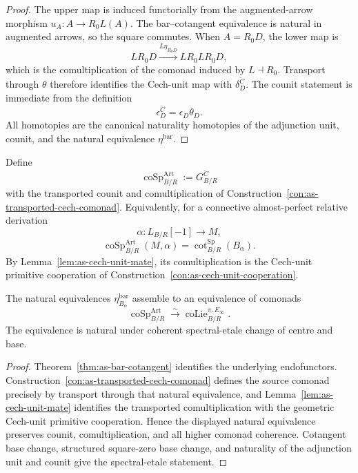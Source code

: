 \begin{proof}
The upper map is induced functorially from the augmented-arrow morphism
$u_A:A\to R_0L(A)$.  The bar--cotangent equivalence is natural in augmented
arrows, so the square commutes.  When $A=R_0D$, the lower map is
\[
    LR_0D
    \xrightarrow{L\eta_{R_0D}}
    LR_0LR_0D,
\]
which is the comultiplication of the comonad induced by $L\dashv R_0$.
Transport through $\theta$ therefore identifies the Cech-unit map with
$\delta_D^{\check C}$.  The counit statement is immediate from the definition
\[
    \epsilon_D^{\check C}=\epsilon_D\theta_D.
\]
All homotopies are the canonical naturality homotopies of the adjunction unit,
counit, and the natural equivalence $\eta^{\mathrm{bar}}$.
\end{proof}

\begin{definition}
\label{def:as-spencer-colie}
Define
\[
\boxed{
    \operatorname{coSp}^{\mathrm{Art}}_{B/R}
    :=
    G^{\check C}_{B/R}
}
\]
with the transported counit and comultiplication of
Construction~\ref{con:as-transported-cech-comonad}.  Equivalently, for a
connective almost-perfect relative derivation
\[
    \alpha:L_{B/R}[-1]\longrightarrow M,
\]
\[
    \operatorname{coSp}^{\mathrm{Art}}_{B/R}(M,\alpha)
    =
    \operatorname{cot}^{\mathrm{Sp}}_{B/R}(B_\alpha).
\]
By Lemma~\ref{lem:as-cech-unit-mate}, its comultiplication is the
Cech-unit primitive cooperation of
Construction~\ref{con:as-cech-unit-cooperation}.
\end{definition}

\begin{theorem}
\label{thm:as-spencer-colie-equals-colie}
The natural equivalences
$\eta_{B_\alpha}^{\mathrm{bar}}$ assemble to an equivalence of comonads
\[
\boxed{
    \operatorname{coSp}^{\mathrm{Art}}_{B/R}
    \xrightarrow{\sim}
    \operatorname{coLie}^{\pi,E_\infty}_{B/R}.
}
\]
The equivalence is natural under coherent spectral-etale change of centre and
base.
\end{theorem}

\begin{proof}
Theorem~\ref{thm:as-bar-cotangent} identifies the underlying endofunctors.
Construction~\ref{con:as-transported-cech-comonad} defines the source comonad
precisely by transport through that natural equivalence, and
Lemma~\ref{lem:as-cech-unit-mate} identifies the transported comultiplication
with the geometric Cech-unit primitive cooperation.  Hence the displayed
natural equivalence preserves counit, comultiplication, and all higher
comonad coherence.  Cotangent base change, structured square-zero base change,
and naturality of the adjunction unit and counit give the spectral-etale
statement.
\end{proof}

